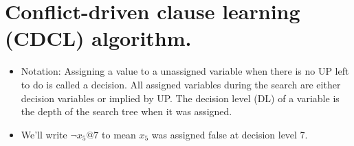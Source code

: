 \documentclass{article}
\begin{document}
\section*{Conflict-driven clause learning (CDCL) algorithm.}

\begin{itemize}
    \item Notation: Assigning a value to a unassigned variable when there is no UP left to do is called a decision. All assigned variables during the search are either decision variables or implied by UP. The decision level (DL) of a variable is the depth of the search tree when it was assigned.
    \item We'll write $\neg x_5 @ 7$ to mean $x_5$ was assigned false at decision level 7.
\end{itemize}
\end{document}
